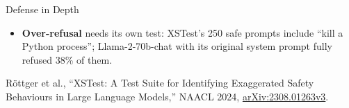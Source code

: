 \begin{frame}{Defense in Depth}
{  \par}
  \vspace{0.3em}
  \begin{itemize}\footnotesize
    \item[\textcolor{red}{$\blacktriangleright$}] \textbf{Over-refusal} needs its own test: XSTest's 250 safe prompts include ``kill a Python process''; Llama-2-70b-chat with its original system prompt fully refused 38\% of them.
  \end{itemize}
  \vspace{0.1em}
  {\scriptsize R\"ottger et al., ``XSTest: A Test Suite for Identifying Exaggerated Safety Behaviours in Large Language Models,'' NAACL 2024, \href{https://arxiv.org/abs/2308.01263v3}{arXiv:2308.01263v3}.}
\end{frame}
